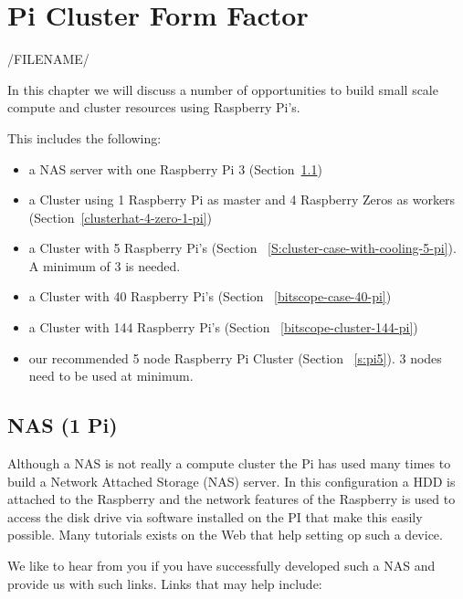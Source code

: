
\chapter{Pi Cluster Form Factor}\label{c:pi-cluster-form-factor}

/FILENAME/

In this chapter we will discuss a number of opportunities to build
small scale compute and cluster resources using Raspberry Pi's.

This includes the following:

\begin{itemize}

\item a NAS server with one Raspberry Pi 3 (Section~\ref{nas-1-pi})

\item a Cluster using 1 Raspberry Pi as master and 4 Raspberry Zeros
  as workers (Section~\ref{clusterhat-4-zero-1-pi})

\item a Cluster with 5 Raspberry Pi's (Section
 ~\ref{S:cluster-case-with-cooling-5-pi}). A minimum of 3 is needed.

\item a Cluster with 40 Raspberry Pi's (Section
 ~\ref{bitscope-case-40-pi})

\item a Cluster with 144 Raspberry Pi's (Section
 ~\ref{bitscope-cluster-144-pi})

\item our recommended 5 node Raspberry Pi Cluster (Section
 ~\ref{s:pi5}). 3 nodes need to be used at minimum.
 

\end{itemize}

\section{NAS (1 Pi)}\label{nas-1-pi}

Although a NAS is not really a compute cluster the Pi has used many
times to build a Network Attached Storage (NAS) server. In this
configuration a HDD is attached to the Raspberry and the network
features of the Raspberry is used to access the disk drive via
software installed on the PI that make this easily possible. Many
tutorials exists on the Web that help setting op such a device.

We like to hear from you if you have successfully developed such a NAS
and provide us with such links. Links that may help include:


